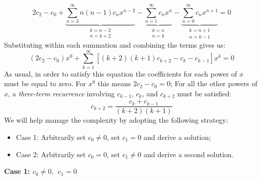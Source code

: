 \begin{equation*}
2c_2 - c_0 + \underbrace{\sum\limits_{n=3}^{\infty}n(n-1)c_nx^{n-2}}_{\substack{k=n-2 \\ n=k+2}} - \underbrace{\sum\limits_{n=1}^{\infty} c_nx^n}_{\substack{k=n \\ n=k}} -\underbrace{\sum\limits_{n=0}^{\infty}c_nx^{n+1}}_{\substack{k=n+1 \\ n=k-1}} = 0
\end{equation*}
Substituting within each summation and combining the terms gives us:
\begin{equation*}
(2c_2-c_0)x^0 + \sum\limits_{k=1}^{\infty}\left[(k+2)(k+1)c_{k+2} - c_k - c_{k-1} \right]x^k = 0
\end{equation*}
As usual, in order to satisfy this equation the coefficients for each power of $x$ must be equal to zero.  For $x^0$ this means $2c_2 - c_0 = 0$;  For all the other powers of $x$, a \emph{three-term recurrence} involving $c_{k-1}$, $c_k$, and $c_{k+2}$ must be satisfied:
\begin{equation*}
c_{k+2} = \frac{c_k + c_{k-1}}{(k+2)(k+1)}
\end{equation*}
We will help manage the complexity by adopting the following strategy:
\begin{itemize}
\item Case 1: Arbitrarily set $c_0 \ne 0$, set $c_1 = 0$ and derive a solution;
\item Case 2: Arbitrarily set $c_0 = 0$, set $c_1 \ne 0$ and derive a second solution.
\end{itemize}

\vspace{0.5cm}

\noindent\textbf{Case 1: $c_0 \ne 0, \ \ c_1=0$}

